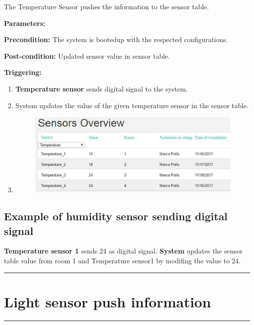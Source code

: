 The Temperature Sensor pushes the information to the sensor table.
\begin{description}
\item \textbf{Parameters:} 
\item \textbf{Precondition:} The system is bootedup with the respected
configurations.
\item \textbf{Post-condition:} Updated sensor value in sensor table.

\item \textbf{Triggering:}
\begin{enumerate}
\item \textbf{Temperature sensor} sends digital signal to the system.
\item System updates the value of the given temperature sensor in the sensor
table.
\item \begin{figure}[H]
\includegraphics[width=1\textwidth]{images/TemperatureSensor.eps}
\end{figure}
\end{enumerate}
\end{description}

\subsection{Example of humidity sensor sending digital signal}
\textbf{Temperature sensor 1} sends 24 as digital signal. \textbf{System}
updates the sensor table value from room 1 and Temperature sensor1 by modifing
the value to 24.
\hfill
\vspace{0.5cm}
\hrule

\break
\section{Light sensor push information}

\hrule
\hfill
\vspace{0.5cm}
\label{operation:Light sensor push information}

